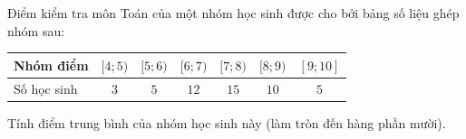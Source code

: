 \begin{ex}
Điểm kiểm tra môn Toán của một nhóm học sinh được cho bởi bảng số liệu ghép nhóm sau:
\begin{center}\small\begin{tabular}{|l|c|c|c|c|c|c|}\hline
Nhóm điểm & $[4;5)$ & $[5;6)$ & $[6;7)$ & $[7;8)$ & $[8;9)$ & $[9;10]$\\\hline
Số học sinh & $3$ & $5$ & $12$ & $15$ & $10$ & $5$\\\hline
\end{tabular}\end{center}
Tính điểm trung bình của nhóm học sinh này (làm tròn đến hàng phần mười).
\end{ex}
